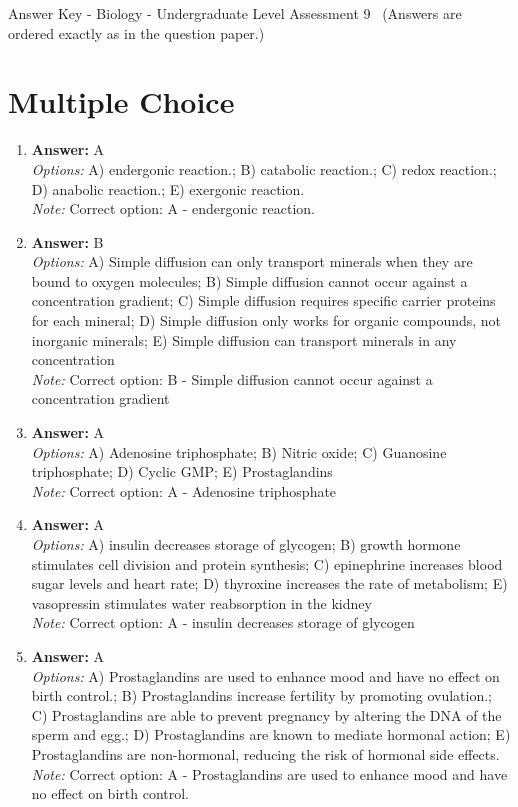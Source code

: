 \documentclass[12pt]{article}
\begin{document}
\begin{center}
Answer Key - Biology - Undergraduate Level Assessment 9 \
\small (Answers are ordered exactly as in the question paper.)
\end{center}

\section*{Multiple Choice}
\begin{enumerate}[label=\arabic*.]
\item \textbf{Answer:} A
\\ \textit{Options:} A) endergonic reaction.; B) catabolic reaction.; C) redox reaction.; D) anabolic reaction.; E) exergonic reaction.
\\ \textit{Note:} Correct option: A - endergonic reaction.
\item \textbf{Answer:} B
\\ \textit{Options:} A) Simple diffusion can only transport minerals when they are bound to oxygen molecules; B) Simple diffusion cannot occur against a concentration gradient; C) Simple diffusion requires specific carrier proteins for each mineral; D) Simple diffusion only works for organic compounds, not inorganic minerals; E) Simple diffusion can transport minerals in any concentration
\\ \textit{Note:} Correct option: B - Simple diffusion cannot occur against a concentration gradient
\item \textbf{Answer:} A
\\ \textit{Options:} A) Adenosine triphosphate; B) Nitric oxide; C) Guanosine triphosphate; D) Cyclic GMP; E) Prostaglandins
\\ \textit{Note:} Correct option: A - Adenosine triphosphate
\item \textbf{Answer:} A
\\ \textit{Options:} A) insulin decreases storage of glycogen; B) growth hormone stimulates cell division and protein synthesis; C) epinephrine increases blood sugar levels and heart rate; D) thyroxine increases the rate of metabolism; E) vasopressin stimulates water reabsorption in the kidney
\\ \textit{Note:} Correct option: A - insulin decreases storage of glycogen
\item \textbf{Answer:} A
\\ \textit{Options:} A) Prostaglandins are used to enhance mood and have no effect on birth control.; B) Prostaglandins increase fertility by promoting ovulation.; C) Prostaglandins are able to prevent pregnancy by altering the DNA of the sperm and egg.; D) Prostaglandins are known to mediate hormonal action; E) Prostaglandins are non-hormonal, reducing the risk of hormonal side effects.
\\ \textit{Note:} Correct option: A - Prostaglandins are used to enhance mood and have no effect on birth control.
\end{enumerate}
\end{document}
